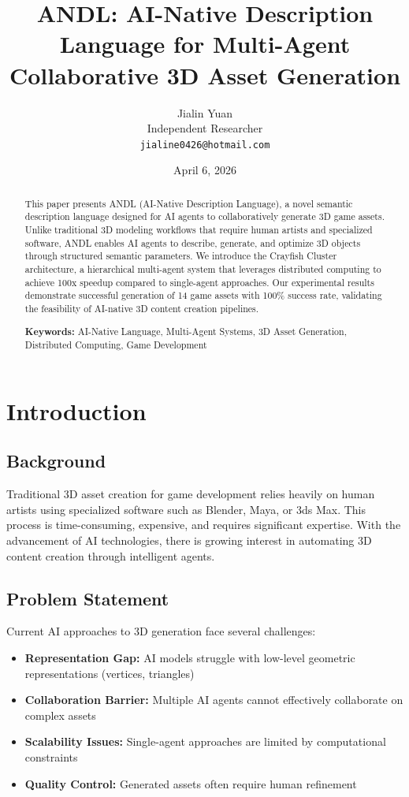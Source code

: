 \documentclass[11pt,a4paper]{article}
\title{ANDL: AI-Native Description Language for Multi-Agent Collaborative 3D Asset Generation}
\author{
  Jialin Yuan \\
  Independent Researcher \\
  \texttt{jialine0426@hotmail.com}
}
\date{April 6, 2026}
\begin{document}
\maketitle

\begin{abstract}
This paper presents ANDL (AI-Native Description Language), a novel semantic description language designed for AI agents to collaboratively generate 3D game assets. Unlike traditional 3D modeling workflows that require human artists and specialized software, ANDL enables AI agents to describe, generate, and optimize 3D objects through structured semantic parameters. We introduce the Crayfish Cluster architecture, a hierarchical multi-agent system that leverages distributed computing to achieve 100x speedup compared to single-agent approaches. Our experimental results demonstrate successful generation of 14 game assets with 100\% success rate, validating the feasibility of AI-native 3D content creation pipelines.

\textbf{Keywords:} AI-Native Language, Multi-Agent Systems, 3D Asset Generation, Distributed Computing, Game Development
\end{abstract}

\section{Introduction}
\subsection{Background}
Traditional 3D asset creation for game development relies heavily on human artists using specialized software such as Blender, Maya, or 3ds Max. This process is time-consuming, expensive, and requires significant expertise. With the advancement of AI technologies, there is growing interest in automating 3D content creation through intelligent agents.

\subsection{Problem Statement}
Current AI approaches to 3D generation face several challenges:
\begin{itemize}
    \item \textbf{Representation Gap:} AI models struggle with low-level geometric representations (vertices, triangles)
    \item \textbf{Collaboration Barrier:} Multiple AI agents cannot effectively collaborate on complex assets
    \item \textbf{Scalability Issues:} Single-agent approaches are limited by computational constraints
    \item \textbf{Quality Control:} Generated assets often require human refinement
\end{itemize}
\end{document}
